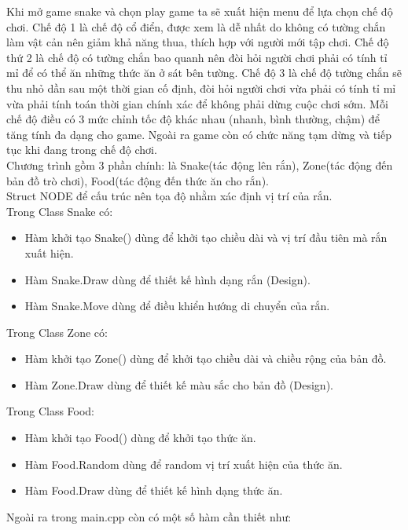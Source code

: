 \documentclass{article}
\begin{document}
Khi mở game snake và chọn play game ta sẽ xuất hiện menu để lựa chọn chế độ chơi. Chế độ 1 là chế độ cổ điển, được xem là dễ nhất do không có tường chắn làm vật cản nên giảm khả năng thua, thích hợp với người mới tập chơi. Chế độ thứ 2 là chế độ có tường chắn bao quanh nên đòi hỏi người chơi phải có tính tỉ mỉ để có thể ăn những thức ăn ở sát bên tường. Chế độ 3 là chế độ tường chắn sẽ thu nhỏ dần sau một thời gian cố định, đòi hỏi người chơi vừa phải có tính tỉ mỉ vừa phải tính toán thời gian chính xác để không phải dừng cuộc chơi sớm. Mỗi chế độ điều có 3 mức chỉnh tốc độ khác nhau (nhanh, bình thường, chậm) để tăng tính đa dạng cho game. Ngoài ra game còn có chức năng tạm dừng và tiếp tục khi đang trong chế độ chơi.\\
Chương trình gồm 3 phần chính: là Snake(tác động lên rắn), Zone(tác động đến bản đồ trò chơi), Food(tác động đến thức ăn cho rắn). \\
Struct NODE để cấu trúc nên tọa độ nhằm xác định vị trí của rắn. \\
Trong Class Snake có:
\begin{itemize}
\item Hàm khởi tạo Snake() dùng để khởi tạo chiều dài và vị trí đầu tiên mà rắn xuất hiện.
\item Hàm Snake.Draw dùng để thiết kế hình dạng rắn (Design). 
\item Hàm Snake.Move dùng để điều khiển hướng di chuyển của rắn. 
\end{itemize}
Trong Class Zone có: 
\begin{itemize}
\item Hàm khởi tạo Zone() dùng để khởi tạo chiều dài và chiều rộng của bản đồ. 
\item Hàm Zone.Draw dùng để thiết kế màu sắc cho bản đồ (Design). 
\end{itemize}
Trong Class Food: 
\begin{itemize}
\item Hàm khởi tạo Food() dùng để khởi tạo thức ăn. 
\item Hàm Food.Random dùng để random vị trí xuất hiện của thức ăn.
\item Hàm Food.Draw dùng để thiết kế hình dạng thức ăn. 
\end{itemize}
Ngoài ra trong main.cpp còn có một số hàm cần thiết như: 
\end{document}
